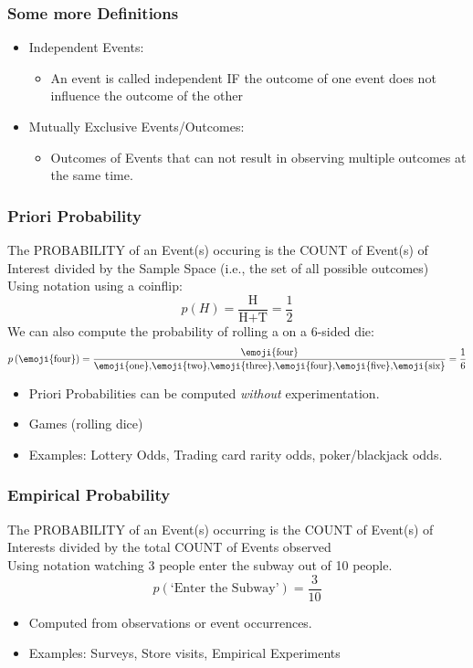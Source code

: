 \documentclass[12pt]{beamer}
\begin{document}
	\begin{frame}
		\frametitle{Some more Definitions}
		\begin{itemize}
			\item Independent Events:
			\begin{itemize}
				\item An event is called independent IF the outcome of one event does not influence the outcome of the other
		\end{itemize}
		\bigskip
		 \item Mutually Exclusive Events/Outcomes:
		 	\begin{itemize}
		 		\item Outcomes of Events that can not result in observing multiple outcomes at the same time. 
		 	\end{itemize}
		\end{itemize}
	\end{frame}
	\begin{frame}
		\frametitle{Priori Probability}
		The PROBABILITY of an Event(s) occuring is the COUNT of Event(s) of Interest divided by the Sample Space (i.e., the set of all possible outcomes) \\Using  notation using a coinflip:
		$$p(H) = \frac{\text{H}}{\text{H} + \text{T}} = \frac{1}{2}$$
		We can also compute the probability of rolling a  on a 6-sided die:
		$$p\left(\text{\emoji{four}}\right) = \frac{\text{\emoji{four}}}{\text{\emoji{one},\emoji{two},\emoji{three},\emoji{four},\emoji{five},\emoji{six}}} = \frac{1}{6}  $$
	\begin{itemize}
		\item Priori Probabilities can be computed \textit{without} experimentation.
		\item Games (rolling dice)
		\item Examples: Lottery Odds, Trading card rarity odds, poker/blackjack odds.
	\end{itemize}
	\end{frame}
	\begin{frame}
		\frametitle{Empirical Probability}
		The PROBABILITY of an Event(s) occurring is the COUNT of Event(s) of Interests divided by the total COUNT of Events observed
		\\Using notation watching 3 people enter the subway out of 10 people. 
		$$ p(\text{`Enter the Subway'}) = \frac{3}{10}$$ 
		\begin{itemize}
			\item Computed from observations or event occurrences. 
			\item Examples: Surveys, Store visits, Empirical Experiments
		\end{itemize}
		\end{frame}
\end{document}

